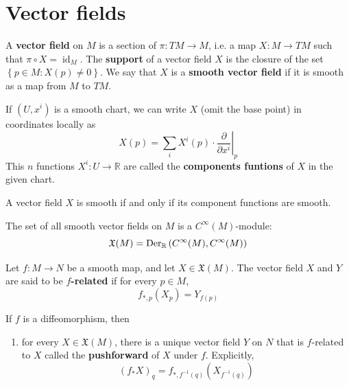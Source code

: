 \documentclass[12pt, oneside]{book}
\begin{document}
\section{Vector fields}
\begin{definition}
    A \textbf{vector field} on $M$ is a section of $\pi: T M \rightarrow M$, i.e. a map $X: M \rightarrow T M$ such that $\pi \circ X=\operatorname{id}_M$.
    The \textbf{support} of a vector field $X$ is the closure of the set $\left\{p \in M: X(p) \neq 0\right\}$.
    We say that $X$ is a \textbf{smooth vector field} if it is smooth as a map from $M$ to $T M$.
    \begin{remark}
        If $\left(U,x^i\right)$ is a smooth chart, we can write $X$ (omit the base point) in coordinates locally as
        \begin{equation*}
            X(p)
            =
            \sum_i X^i(p) \cdot \left.\frac{\partial}{\partial x^i}\right|_p
        \end{equation*}
        This $n$ functions $X^i: U \rightarrow \mathbb{R}$ are called the \textbf{components funtions} of $X$ in the given chart.
    \end{remark}
\end{definition}

\begin{proposition}
    A vector field $X$ is smooth if and only if its component functions are smooth.
\end{proposition}

\begin{proposition}
    The set of all smooth vector fields on $M$ is a $C^\infty(M)$-module:
    \begin{equation*}
        \mathfrak{X}(M) =\operatorname{Der}_{\mathbb{R}}\left(C^\infty(M),C^\infty(M)\right)
    \end{equation*}
\end{proposition}



\begin{definition}
    Let $f: M \rightarrow N$ be a smooth map, and let $X\in \mathfrak{X}(M)$.
    The vector field $X$ and $Y$ are said to be \textbf{$f$-related} if for every $p \in M$,
    \begin{equation*}
        f_{*,p}(X_p)=Y_{f(p)}
    \end{equation*}
\end{definition}

\begin{proposition}
    If $f$ is a diffeomorphism, then

    \begin{enumerate}
        \item
              for every $X \in \mathfrak{X}(M)$, there is a unique vector field $Y$ on $N$ that is $f$-related to $X$ called the \textbf{pushforward} of $X$ under $f$.
              Explicitly,
              \begin{equation*}
                  (f_{*}X)_q=f_{*,f^{-1}(q)}(X_{f^{-1}(q)})
              \end{equation*}
    \end{enumerate}
\end{proposition}
\end{document}
